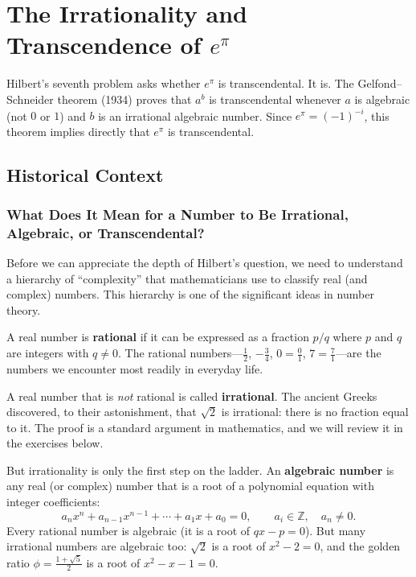 
\chapter{The Irrationality and Transcendence of \texorpdfstring{$e^\pi$}{e^pi}}

\begin{solvedbox}
Hilbert's seventh problem asks whether $e^\pi$ is transcendental. It is. The Gelfond--Schneider theorem (1934) proves that $a^b$ is transcendental whenever $a$ is algebraic (not $0$ or $1$) and $b$ is an irrational algebraic number. Since $e^\pi = (-1)^{-i}$, this theorem implies directly that $e^\pi$ is transcendental.
\end{solvedbox}

\section{Historical Context}

\subsection{What Does It Mean for a Number to Be Irrational, Algebraic, or Transcendental?}

Before we can appreciate the depth of Hilbert's question, we need to understand a hierarchy of ``complexity'' that mathematicians use to classify real (and complex) numbers. This hierarchy is one of the significant ideas in number theory.

A real number is \textbf{rational} if it can be expressed as a fraction $p/q$ where $p$ and $q$ are integers with $q \neq 0$. The rational numbers---$\frac{1}{2}$, $-\frac{3}{4}$, $0 = \frac{0}{1}$, $7 = \frac{7}{1}$---are the numbers we encounter most readily in everyday life.

A real number that is \emph{not} rational is called \textbf{irrational}. The ancient Greeks discovered, to their astonishment, that $\sqrt{2}$ is irrational: there is no fraction equal to it. The proof is a standard argument in mathematics, and we will review it in the exercises below.

But irrationality is only the first step on the ladder. An \textbf{algebraic number} is any real (or complex) number that is a root of a polynomial equation with integer coefficients:
\[
    a_n x^n + a_{n-1} x^{n-1} + \cdots + a_1 x + a_0 = 0, \qquad a_i \in \mathbb{Z}, \quad a_n \neq 0.
\]
Every rational number is algebraic (it is a root of $qx - p = 0$). But many irrational numbers are algebraic too: $\sqrt{2}$ is a root of $x^2 - 2 = 0$, and the golden ratio $\phi = \frac{1+\sqrt{5}}{2}$ is a root of $x^2 - x - 1 = 0$.

